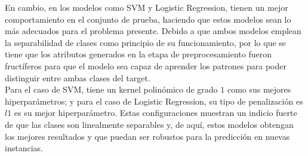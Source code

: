 \documentclass[12pt,a4paper]{article}
\begin{document}
{{            En cambio, en los modelos como SVM y Logistic Regression, tienen un mejor comportamiento 
            en el conjunto de prueba, haciendo que estos modelos sean lo más adecuados para el problema 
            presente. Debido a que ambos modelos emplean la separabilidad de clases como principio de 
            su funcionamiento, por lo que se tiene que los atributos generados en la etapa de preprocesamiento 
            fueron fructíferos para que el modelo sea capaz de aprender los patrones para poder distinguir 
            entre ambas clases del target.\\

            Para el caso de SVM, tiene un kernel polinómico de grado $1$ como sus mejores hiperparámetros; 
            y para el caso de Logistic Regression, su tipo de penalización es $l1$ es su mejor hiperparámetro. 
            Estas configuraciones muestran un indicio fuerte de que las clases son linealmente separables y, 
            de aquí, estos modelos obtengan los mejores resultados y que puedan ser robustos para la predicción 
            en nuevas instancias.
        }
    }
    \newpage
\end{document}
